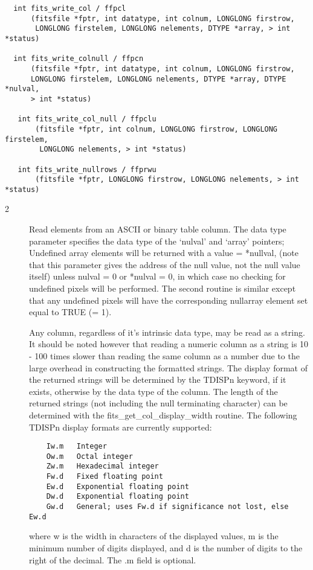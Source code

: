\documentclass[11pt]{book}
\begin{document}
\begin{verbatim}
  int fits_write_col / ffpcl
      (fitsfile *fptr, int datatype, int colnum, LONGLONG firstrow,
       LONGLONG firstelem, LONGLONG nelements, DTYPE *array, > int *status)

  int fits_write_colnull / ffpcn
      (fitsfile *fptr, int datatype, int colnum, LONGLONG firstrow,
      LONGLONG firstelem, LONGLONG nelements, DTYPE *array, DTYPE *nulval,
      > int *status)

   int fits_write_col_null / ffpclu
       (fitsfile *fptr, int colnum, LONGLONG firstrow, LONGLONG firstelem,
        LONGLONG nelements, > int *status)

   int fits_write_nullrows / ffprwu
       (fitsfile *fptr, LONGLONG firstrow, LONGLONG nelements, > int *status)
\end{verbatim}

\begin{description}
\item[2 ] Read elements from an ASCII or binary table column.  The data type
    parameter specifies the data type of the `nulval' and `array'  pointers;
    Undefined array elements will be returned with a value = *nullval,
    (note that this parameter gives the address of the null value, not the
    null value itself) unless nulval = 0 or *nulval = 0, in which case
    no checking for undefined pixels will be performed.  The second
    routine is similar except that any undefined pixels will have the
    corresponding nullarray element set equal to TRUE (= 1).

    Any column, regardless of it's intrinsic data type, may be read as a
    string.  It should be noted however that reading a numeric column
    as a string is 10 - 100 times slower than reading the same column
    as a number due to the large overhead in constructing the formatted
    strings.  The display format of the returned strings will be
    determined by the TDISPn keyword, if it exists, otherwise by the
    data type of the column.  The length of the returned strings (not
    including the null terminating character) can be determined with
    the fits\_get\_col\_display\_width routine.  The following TDISPn
    display formats are currently supported:

\begin{verbatim}
    Iw.m   Integer
    Ow.m   Octal integer
    Zw.m   Hexadecimal integer
    Fw.d   Fixed floating point
    Ew.d   Exponential floating point
    Dw.d   Exponential floating point
    Gw.d   General; uses Fw.d if significance not lost, else Ew.d
\end{verbatim}
    where w is the width in characters of the displayed values, m is the minimum
    number of digits displayed, and d is the number of digits to the right of the
    decimal.  The .m field is optional.
   \label{ffgcv} \label{ffgcf}
\end{description}
\end{document}
